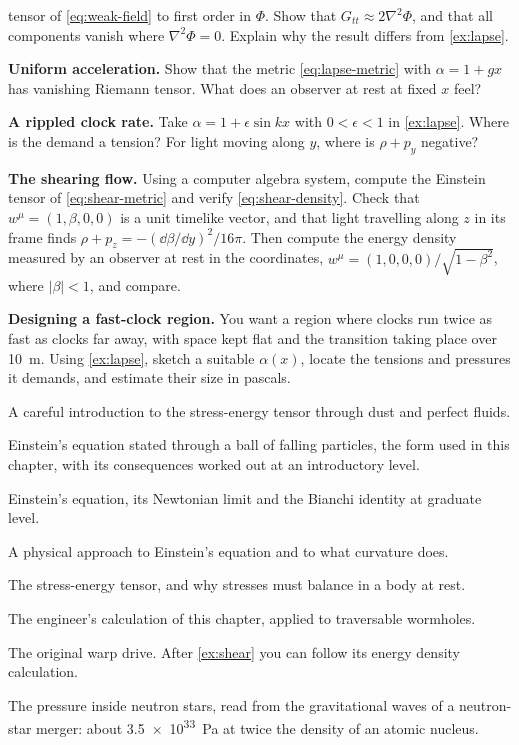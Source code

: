 \begin{problems}
  tensor of \cref{eq:weak-field} to first order in $\Phi$. Show that
  $G_{tt} \approx 2\nabla^{2}\Phi$, and that all components vanish where
  $\nabla^{2}\Phi = 0$. Explain why the result differs from \cref{ex:lapse}.
\item {}\label{prob:rindler} \textbf{Uniform acceleration.} Show that the
  metric \cref{eq:lapse-metric} with $\alpha = 1 + gx$ has vanishing Riemann
  tensor. What does an observer at rest at fixed $x$ feel?
\item {} \textbf{A rippled clock rate.} Take $\alpha = 1 + \epsilon\sin kx$
  with $0 < \epsilon < 1$ in \cref{ex:lapse}. Where is the demand a tension? For
  light moving along $y$, where is $\rho + p_{y}$ negative?
\item {}\label{prob:shear-check} \textbf{The shearing flow.} Using a
  computer algebra system, compute the Einstein tensor of \cref{eq:shear-metric}
  and verify \cref{eq:shear-density}. Check that $w^{\mu} = (1,\beta,0,0)$ is a
  unit timelike vector, and that light travelling along $z$ in its frame finds
  $\rho + p_{z} = -(\dd\beta/\dd y)^{2}/16\pi$. Then compute the energy density measured by an observer
  at rest in the coordinates, $w^{\mu} = (1,0,0,0)/\sqrt{1-\beta^{2}}$, where
  $|\beta| < 1$, and compare.
\item {} \textbf{Designing a fast-clock region.} You want a region where
  clocks run twice as fast as clocks far away, with space kept flat and the
  transition taking place over \SI{10}{\metre}. Using \cref{ex:lapse}, sketch a
  suitable $\alpha(x)$, locate the tensions and pressures it demands, and
  estimate their size in pascals.
\end{problems}

\begin{furtherreading}
\item[\textcite{Schutz2009}] A careful introduction to the stress-energy tensor
  through dust and perfect fluids.
\item[\textcite{Baez2005}] Einstein's equation stated through a ball of
  falling particles, the form used in this chapter, with its consequences
  worked out at an introductory level.
\item[\textcite{Carroll2004}] Einstein's equation, its Newtonian limit and the
  Bianchi identity at graduate level.
\item[\textcite{Hartle2003}] A physical approach to Einstein's equation and to
  what curvature does.
\item[\textcite{Misner1973}] The stress-energy tensor, and why stresses must
  balance in a body at rest.
\item[\textcite{Morris1988a}] The engineer's calculation of this chapter,
  applied to traversable wormholes.
\item[\textcite{Alcubierre1994}] The original warp drive. After \cref{ex:shear}
  you can follow its energy density calculation.
\item[\textcite{Abbott2018}] The pressure inside neutron stars, read from the
  gravitational waves of a neutron-star merger: about \SI{3.5e33}{\pascal} at
  twice the density of an atomic nucleus.
\end{furtherreading}
